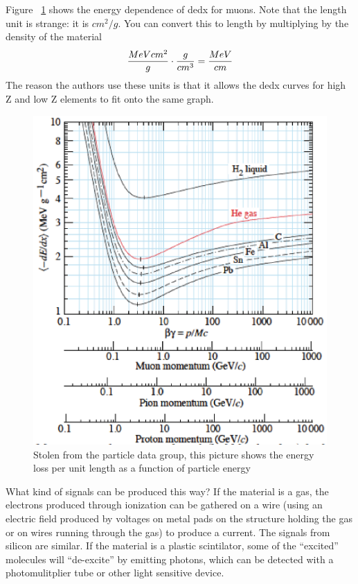 Figure ~\ref{fig:pdgdedx} shows the energy dependence of dedx for muons.  Note that the length unit is strange: it is $cm^2/g$.  You can convert this to length by multiplying by the density of the material
\begin{equation}
{{MeV cm^2}\over{g}} \cdot {{g}\over{cm^3}} = {{MeV}\over{cm}}
\end{equation}
The reason the authors use these units is that it allows the dedx curves for high Z and low Z elements to fit onto the same graph.

\begin{figure}[h]
\centering\includegraphics[scale=0.5]{./particleinteractions/Pictures/dedx.eps}
\caption{Stolen from the particle data group, this picture shows the energy
loss per unit length as a function of particle energy}
\label{fig:pdgdedx}
\end{figure}

What kind of signals can be produced this way?  If the material is a gas, the electrons produced through ionization can be gathered on a wire (using an electric field produced by voltages on metal pads on the structure holding the gas or on wires running through the gas) to produce a current.  The signals from silicon are similar.  If the material is a plastic scintilator, some of the ``excited'' molecules will ``de-excite'' by emitting photons, which can be detected with a photomulitplier tube or other light sensitive device.

